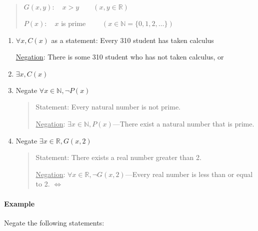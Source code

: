 \documentclass[../main.tex]{subfiles}
\begin{document}
\begin{quote}
    $G(x,y):\quad x > y \qquad (x, y \in \mathbb{R})$ 

    $P(x): \quad x$ is prime $\qquad (x \in \mathbb{N} = \{0, 1, 2, \dots\})$
\end{quote}

\begin{enumerate}
    \item $\forall x, C(x)$ as a statement: Every 310 student has taken calculus
    
    \underline{Negation}: There is some 310 student who has not taken calculus, or

    \item $\exists x, C(x)$
    
    \item Negate $\forall x \in \mathbb{N}, \neg P(x)$

    \begin{quote}
        Statement: Every natural number is not prime.
    
        \underline{Negation}: $\exists x \in \mathbb{N}, P(x)$---There exist a natural number that is
        prime.
    \end{quote}
    
    \item Negate $\exists x \in \mathbb{R}, G(x, 2)$
    
    \begin{quote}
        Statement: There exists a real number greater than 2.

        \underline{Negation}: $\forall x \in \mathbb{R}, \neg G(x, 2)$---Every real number is less
        than or equal to 2. $\iff$
    \end{quote}
\end{enumerate}

\paragraph{Example} Negate the following statements:
\end{document}
